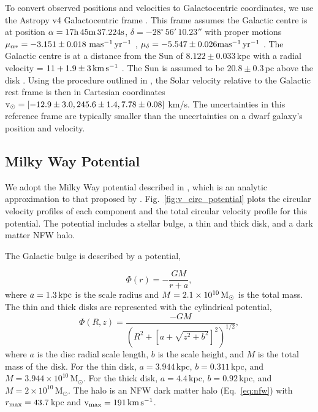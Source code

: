 To convert observed positions and velocities to Galactocentric
coordinates, we use the Astropy v4 Galactocentric frame
\citep{astropycollaboration+2022}. This frame assumes the Galactic
centre is at position \(\alpha = {\rm 17h\,45m\,37.224s}\),
\(\delta = -28^\circ\,56'\,10.23''\) with proper motions
\(\mu_{\alpha*}=-3.151\pm0.018\ {\rm mas^{-1}\,yr^{-1}}\) ,
\(\mu_\delta=-5.547\pm0.026 {\rm mas^{-1}\,yr^{-1}}\) \citep[from the appendix and Table
2 of][]{reid+brunthaler2004}. The Galactic centre is at a distance from
the Sun of \(8.122\pm0.033\,\)kpc with a radial velocity =
\(11 + 1.9 \pm 3\,{\rm km\,s^{-1}}\) \citep{gravitycollaboration+2018}. The Sun is
assumed to be \(20.8\pm0.3\,\)pc above the disk
\citep{bennett+bovy2019}. Using the procedure outlined in
\citet{drimmel+poggio2018}, the Solar velocity relative to the Galactic
rest frame is then in Cartesian coordinates
\({\rm v}_\odot = [-12.9 \pm 3.0, 245.6 \pm 1.4, 7.78 \pm 0.08]\) km/s. The
uncertainties in this reference frame are typically smaller than the
uncertainties on a dwarf galaxy's position and velocity.

\subsection{Milky Way Potential}\label{milky-way-potential}

We adopt the Milky Way potential described in \citet{EP2020}, which is
an analytic approximation to that proposed by \citet{mcmillan2011}.
Fig.~\ref{fig:v_circ_potential} plots the circular velocity profiles of
each component and the total circular velocity profile for this
potential. The potential includes a stellar bulge, a thin and thick
disk, and a dark matter NFW halo.

The Galactic bulge is described by a \citet{hernquist1990} potential,

\begin{equation}{
\Phi(r) = - \frac{GM}{r + a},
}\end{equation} where \(a=1.3\,{\rm kpc}\) is the scale radius and
\(M=2.1 \times 10^{10}\,{\rm M}_{\odot}\) is the total mass. The thin and thick
disks are represented with the \citet{miyamoto+nagai1975} cylindrical
potential, \begin{equation}{
\Phi(R, z) = \frac{-GM}{\left(R^2 + \left[a + \sqrt{z^2 + b^2}\right]^{2}\right)^{1/2}},
}\end{equation} where \(a\) is the disc radial scale length, \(b\) is
the scale height, and \(M\) is the total mass of the disk. For the thin
disk, \(a=3.944\,\)kpc, \(b=0.311\,\)kpc, and
\(M=3.944\times10^{10}\,\)M\(_\odot\). For the thick disk,
\(a=4.4\,\)kpc, \(b=0.92\,\)kpc, and \(M=2\times10^{10}\,\)M\(_\odot\).
The halo is an NFW dark matter halo (Eq.~\ref{eq:nfw}) with
\(r_{\rm max} = 43.7\,\)kpc and \({\rm v}_{\rm max} = 191\,{\rm km\,s^{-1}}\).

